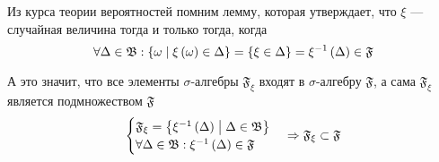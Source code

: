 Из курса теории вероятностей помним лемму, которая утверждает,
что $\xi$ --- случайная величина тогда и только тогда, когда
$$\forall\Delta\in\mathfrak{B}:
  \left\{ \omega \;\middle|\; \xi\left( \omega \right) \in \Delta \right\}
  = \left\{ \xi\in\Delta \right\}
  = \xi^{-1}\left( \Delta \right) \in \mathfrak{F}$$

А это значит, что все элементы $\sigma$-алгебры $\mathfrak{F}_\xi$
входят в $\sigma$-алгебру $\mathfrak{F}$, а сама $\mathfrak{F}_\xi$
является подмножеством $\mathfrak{F}$
\begin{align*}
  \begin{cases}
      \mathfrak{F}_\xi
      = \left\{ \xi^{-1}\left( \Delta \right)
          \;\middle|\; \Delta\in\mathfrak{B} \right\}\\
      \forall\Delta\in\mathfrak{B}:
      \xi^{-1}\left( \Delta \right) \in \mathfrak{F}
  \end{cases}
  \Rightarrow
  \mathfrak{F}_\xi \subset \mathfrak{F}
\end{align*}

